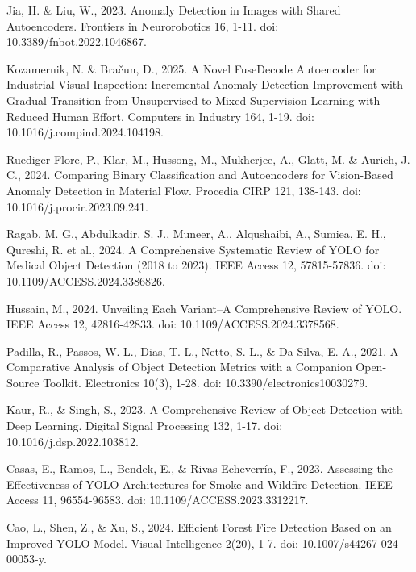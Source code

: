 \begin{thebibliography}{9}
  Jia, H. \& Liu, W., 2023. Anomaly Detection in Images with Shared
  Autoencoders. Frontiers in Neurorobotics 16, 1-11. doi:
  10.3389/fnbot.2022.1046867.

  Kozamernik, N. \& Bračun, D., 2025. A Novel FuseDecode Autoencoder
  for Industrial Visual Inspection: Incremental Anomaly Detection
  Improvement with Gradual Transition from Unsupervised to
  Mixed-Supervision Learning with Reduced Human Effort. Computers in
  Industry 164, 1-19. doi: 10.1016/j.compind.2024.104198.

  Ruediger-Flore, P., Klar, M., Hussong, M., Mukherjee, A., Glatt,
  M. \& Aurich, J. C., 2024. Comparing Binary Classification and
  Autoencoders for Vision-Based Anomaly Detection in Material Flow.
  Procedia CIRP 121, 138-143. doi: 10.1016/j.procir.2023.09.241.

  Ragab, M. G., Abdulkadir, S. J., Muneer, A., Alqushaibi, A.,
  Sumiea, E. H., Qureshi, R. et al., 2024. A
  Comprehensive Systematic Review of YOLO for Medical Object
  Detection (2018 to 2023). IEEE Access 12, 57815-57836. doi:
  10.1109/ACCESS.2024.3386826.

  Hussain, M., 2024. Unveiling Each Variant–A Comprehensive Review of
  YOLO. IEEE Access 12, 42816-42833. doi: 10.1109/ACCESS.2024.3378568.

  Padilla, R., Passos, W. L., Dias, T. L., Netto, S. L., \& Da Silva,
  E. A., 2021. A Comparative Analysis of Object Detection Metrics
  with a Companion Open-Source Toolkit. Electronics 10(3), 1-28. doi:
  10.3390/electronics10030279.

  Kaur, R., \& Singh, S., 2023. A Comprehensive Review of Object
  Detection with Deep Learning. Digital Signal Processing 132, 1-17.
  doi: 10.1016/j.dsp.2022.103812.

  Casas, E., Ramos, L., Bendek, E., \& Rivas-Echeverría, F., 2023.
  Assessing the Effectiveness of YOLO Architectures for Smoke and
  Wildfire Detection. IEEE Access 11, 96554-96583. doi:
  10.1109/ACCESS.2023.3312217.

  Cao, L., Shen, Z., \& Xu, S., 2024. Efficient Forest Fire Detection
  Based on an Improved YOLO Model. Visual Intelligence 2(20), 1-7.
  doi: 10.1007/s44267-024-00053-y.


\end{thebibliography}
